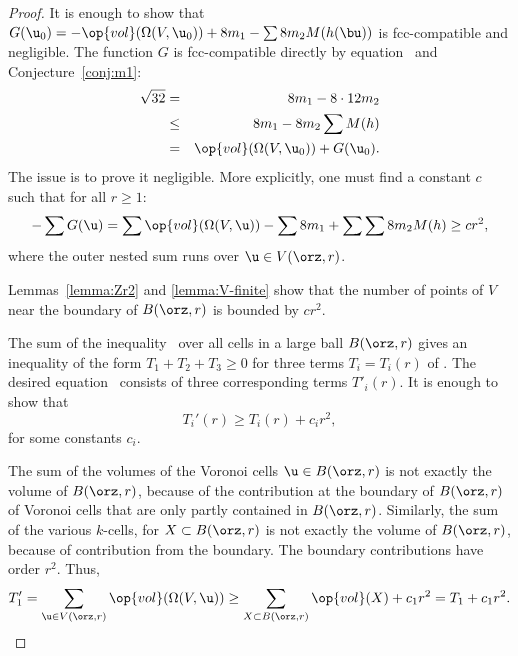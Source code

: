 \begin{proof} 
It is enough to show that $G( \u_0) = -\op{vol}(\Omega(V, \u_0)) + 8
m_1 - \sum 8 m_2 M(h(\bu))$ is fcc-compatible and negligible.
The function $G$ is fcc-compatible directly
by equation~
and Conjecture~\ref{conj:m1}:
%
%
\begin{eqnarray*}
\sqrt{32} &=& 8 m_1 - 8\cdot 12 m_2\\
&\le& 8 m_1 - 8 m_2 \sum M(h)\\
&=& \op{vol}(\Omega(V, \u_0)) + G( \u_0).
\end{eqnarray*}
The issue is to prove it negligible.  More explicitly, one must find a
constant $c$ such that for all $r\ge 1$:%
\begin{equation}\label{eqn:neg}
-\sum G( \u) = \sum \op{vol}(\Omega(V, \u)) 
-\sum 8m_1 + \sum \sum 8 m_2 M(h) \ge c r^2,
\end{equation}
where the outer nested sum runs over $ \u\in  V(\orz,r)$.

Lemmas~\ref{lemma:Zr2} and \ref{lemma:V-finite} show that the number
of points of $ V$ near the boundary of $B(\orz,r)$ is bounded by $c
r^2$.


The sum of the inequality~ over all cells in a large ball
$B(\orz,r)$ gives an inequality of the form $T_1 + T_2 + T_3\ge 0$ for
three terms $T_i = T_i(r)$ of .  The desired
equation~ consists of three corresponding terms
$T'_i(r)$.  It is enough to show that
\begin{displaymath}
T_i'(r) \ge T_i(r) + c_i r^2,
\end{displaymath}
for some constants $c_i$.

The sum of the volumes of the Voronoi cells $ \u\in B(\orz,r)$ is not
exactly the volume of $B(\orz,r)$, because of the contribution at the
boundary of $B(\orz,r)$ of Voronoi cells that are only partly contained
in $B(\orz,r)$.  Similarly, the sum of the various $k$-cells, for
$X\subset B(\orz,r)$ is not exactly the volume of $B(\orz,r)$, because of
contribution from the boundary. The boundary contributions have order
$r^2$. Thus,
\begin{displaymath}
T_1'= \sum_{ \u\in  V(\orz,r)} \op{vol}(\Omega(V, \u)) 
\ge \sum_{X\subset B(\orz,r)} \op{vol}(X) + c_1 r^2 = T_1 + c_1 r^2.
\end{displaymath}



\end{proof}
